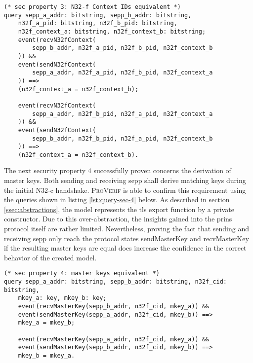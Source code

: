 \begin{lstlisting}[caption={Query for security property 3},label={lst:query-sec-3},firstnumber=221]
(* sec property 3: N32-f Context IDs equivalent *)
query sepp_a_addr: bitstring, sepp_b_addr: bitstring,
    n32f_a_pid: bitstring, n32f_b_pid: bitstring,
    n32f_context_a: bitstring, n32f_context_b: bitstring;
    event(recvN32fContext(
        sepp_b_addr, n32f_a_pid, n32f_b_pid, n32f_context_b
    )) &&
    event(sendN32fContext(
        sepp_a_addr, n32f_a_pid, n32f_b_pid, n32f_context_a
    )) ==>
    (n32f_context_a = n32f_context_b);

    event(recvN32fContext(
        sepp_a_addr, n32f_b_pid, n32f_a_pid, n32f_context_a
    )) &&
    event(sendN32fContext(
        sepp_b_addr, n32f_b_pid, n32f_a_pid, n32f_context_b
    )) ==>
    (n32f_context_a = n32f_context_b).
\end{lstlisting}

The next security property 4 successfully proven concerns the derivation of master keys.
Both sending and receiving \gls{sepp} shall derive matching keys during the initial N32-c handshake.
\textsc{ProVerif} is able to confirm this requirement using the queries shown in listing \ref{lst:query-sec-4} below.
As described in section \ref{ssec:abstractions}, the model represents the \gls{tls} export function by a private constructor.
Due to this over-abstraction, the insights gained into the \gls{prins} protocol itself are rather limited.
Nevertheless, proving the fact that sending and receiving \gls{sepp} only reach the protocol states {\sffamily sendMasterKey} and {\sffamily recvMasterKey} if the resulting master keys are equal does increase the confidence in the correct behavior of the created model.

\begin{lstlisting}[caption={Query for security property 4},label={lst:query-sec-4},firstnumber=221]
(* sec property 4: master keys equivalent *)
query sepp_a_addr: bitstring, sepp_b_addr: bitstring, n32f_cid: bitstring,
    mkey_a: key, mkey_b: key;
    event(recvMasterKey(sepp_b_addr, n32f_cid, mkey_a)) &&
    event(sendMasterKey(sepp_a_addr, n32f_cid, mkey_b)) ==>
    mkey_a = mkey_b;

    event(recvMasterKey(sepp_a_addr, n32f_cid, mkey_a)) &&
    event(sendMasterKey(sepp_b_addr, n32f_cid, mkey_b)) ==>
    mkey_b = mkey_a.
\end{lstlisting}

